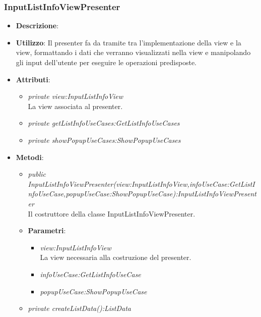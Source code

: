 \subsubsection{InputListInfoViewPresenter}
\begin{itemize}
\item \textbf{Descrizione}: 
\item \textbf{Utilizzo}: Il presenter fa da tramite tra l'implementazione della view e la view, formattando i dati che verranno visualizzati nella view e manipolando gli input dell'utente per eseguire le operazioni predisposte.
\item \textbf{Attributi}: 	
	\begin{itemize}
	\item \textit{private view:InputListInfoView}\\
		La view associata al presenter.
	\item \textit{private getListInfoUseCases:GetListInfoUseCases}\\
		
	\item \textit{private showPopupUseCases:ShowPopupUseCases}\\
	
	\end{itemize}
\item \textbf{Metodi}:
	\begin{itemize}	
	\item \textit{public InputListInfoViewPresenter(view:InputListInfoView,infoUseCase:GetListInfoUseCase,popupUseCase:ShowPopupUseCase):InputListInfoViewPresenter}\\
	Il costruttore della classe InputListInfoViewPresenter.
			\item{\textbf{Parametri}: \begin{itemize}
			\item \textit{view:InputListInfoView}\\
			La view necessaria alla costruzione del presenter.
			\item \textit{infoUseCase:GetListInfoUseCase}\\

			\item \textit{popupUseCase:ShowPopupUseCase}\\

			\end{itemize}}
	\item \textit{private createListData():ListData}\\
	 

\end{itemize}
\end{itemize}
